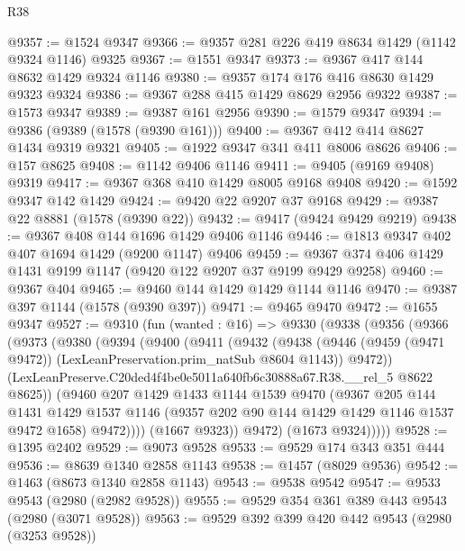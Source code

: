 \begin{lexlean}{R38}
\begin{coremodule}
@9357 := @1524 @9347
@9366 := @9357 @281 @226 @419 @8634 @1429 (@1142 @9324 @1146) @9325
@9367 := @1551 @9347
@9373 := @9367 @417 @144 @8632 @1429 @9324 @1146
@9380 := @9357 @174 @176 @416 @8630 @1429 @9323 @9324
@9386 := @9367 @288 @415 @1429 @8629 @2956 @9322
@9387 := @1573 @9347
@9389 := @9387 @161 @2956
@9390 := @1579 @9347
@9394 := @9386 (@9389 (@1578 (@9390 @161)))
@9400 := @9367 @412 @414 @8627 @1434 @9319 @9321
@9405 := @1922 @9347 @341 @411 @8006 @8626
@9406 := @157 @8625
@9408 := @1142 @9406 @1146
@9411 := @9405 (@9169 @9408) @9319
@9417 := @9367 @368 @410 @1429 @8005 @9168 @9408
@9420 := @1592 @9347 @142 @1429
@9424 := @9420 @22 @9207 @37 @9168
@9429 := @9387 @22 @8881 (@1578 (@9390 @22))
@9432 := @9417 (@9424 @9429 @9219)
@9438 := @9367 @408 @144 @1696 @1429 @9406 @1146
@9446 := @1813 @9347 @402 @407 @1694 @1429 (@9200 @1147) @9406
@9459 := @9367 @374 @406 @1429 @1431 @9199 @1147 (@9420 @122 @9207 @37 @9199 @9429 @9258)
@9460 := @9367 @404
@9465 := @9460 @144 @1429 @1429 @1144 @1146
@9470 := @9387 @397 @1144 (@1578 (@9390 @397))
@9471 := @9465 @9470
@9472 := @1655 @9347
@9527 := @9310
    (fun (wanted : @16) =>
    @9330
      (@9338
        (@9356
          (@9366
            (@9373
              (@9380
                (@9394
                  (@9400
                    (@9411
                      (@9432
                        (@9438
                          (@9446
                            (@9459 (@9471 @9472))
                            (LexLeanPreservation.prim_natSub @8604 @1143))
                          @9472))
                      (LexLeanPreserve.C20ded4f4be0e5011a640fb6c30888a67.R38.__rel_5 @8622 @8625))
                    (@9460
                      @207
                      @1429
                      @1433
                      @1144
                      @1539
                      @9470
                      (@9367
                        @205
                        @144
                        @1431
                        @1429
                        @1537
                        @1146
                        (@9357 @202 @90 @144 @1429 @1429 @1146 @1537 @9472 @1658)
                        @9472))))
                (@1667 @9323))
              @9472)
            (@1673 @9324)))))
@9528 := @1395 @2402
@9529 := @9073 @9528
@9533 := @9529 @174 @343 @351 @444
@9536 := @8639 @1340 @2858 @1143
@9538 := @1457 (@8029 @9536)
@9542 := @1463 (@8673 @1340 @2858 @1143)
@9543 := @9538 @9542
@9547 := @9533 @9543 (@2980 (@2982 @9528))
@9555 := @9529 @354 @361 @389 @443 @9543 (@2980 (@3071 @9528))
@9563 := @9529 @392 @399 @420 @442 @9543 (@2980 (@3253 @9528))

\end{coremodule}
\end{lexlean}
